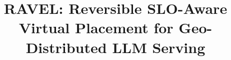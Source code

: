 \documentclass[letterpaper,twocolumn,10pt]{article}
\begin{document}
\date{}

\title{\Large \bf RAVEL: Reversible SLO-Aware Virtual Placement for Geo-Distributed LLM Serving}


\maketitle

\thispagestyle{empty}








{\footnotesize


}
\clearpage
\appendix



\end{document}

